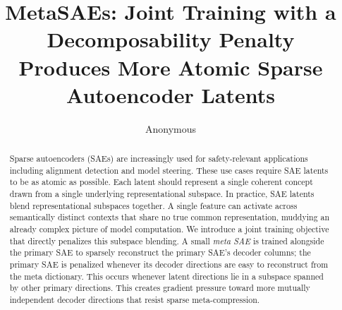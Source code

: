 \documentclass{article} %
\title{MetaSAEs: Joint Training with a Decomposability Penalty\\
Produces More Atomic Sparse Autoencoder Latents}
\author{Anonymous}
\begin{document}
\ifcolmsubmission
\linenumbers
\fi

\maketitle

\begin{abstract}

Sparse autoencoders (SAEs) are increasingly used for safety-relevant applications
including alignment detection and model steering.
These use cases require SAE latents to be as atomic as possible. Each latent
should represent a single
coherent concept drawn from a single underlying representational subspace.
In practice, SAE latents blend representational subspaces together. A single
feature can activate across semantically distinct contexts that share no true
common representation, muddying an already complex picture of model computation.
We introduce a joint training objective that directly penalizes this subspace
blending.
A small \emph{meta SAE} is trained alongside the primary SAE to sparsely
reconstruct the primary SAE's decoder columns; the primary SAE is penalized
whenever its decoder directions are easy to reconstruct from the meta
dictionary. This occurs whenever latent directions lie in a subspace spanned by other
primary directions.
This creates gradient pressure toward more mutually independent decoder directions
that resist sparse meta-compression.


\end{abstract}
\end{document}

